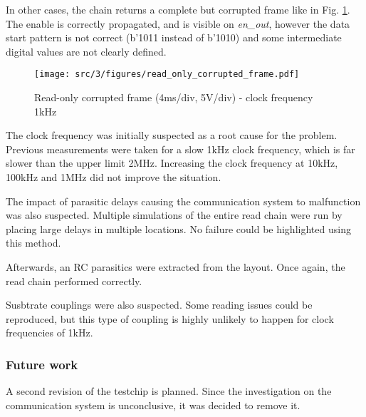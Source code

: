 In other cases, the chain returns a complete but corrupted frame like in Fig. \ref{fig:read-only-full-frame}.
The enable is correctly propagated, and is visible on \textit{en\_out}, however the data start pattern is not correct (b'1011 instead of b'1010) and some intermediate digital values are not clearly defined.

\begin{figure}[!htbp]
  \centering
  \texttt{[image: src/3/figures/read\_only\_corrupted\_frame.pdf]}
  \caption{Read-only corrupted frame (4ms/div, 5V/div) - clock frequency 1kHz}
  \label{fig:read-only-full-frame}
\end{figure}

The clock frequency was initially suspected as a root cause for the problem.
Previous measurements were taken for a slow 1kHz clock frequency, which is far slower than the upper limit 2MHz.
Increasing the clock frequency at 10kHz, 100kHz and 1MHz did not improve the situation.

The impact of parasitic delays causing the communication system to malfunction was also suspected.
Multiple simulations of the entire read chain were run by placing large delays in multiple locations.
No failure could be highlighted using this method.

Afterwards, an RC parasitics were extracted from the layout.
Once again, the read chain performed correctly.

Susbtrate couplings were also suspected.
Some reading issues could be reproduced, but this type of coupling is highly unlikely to happen for clock frequencies of 1kHz.

\subsubsection{Future work}

A second revision of the testchip is planned.
Since the investigation on the communication system is unconclusive, it was decided to remove it.
